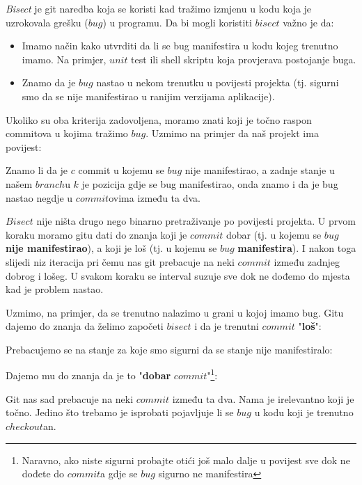 
\emph{Bisect} je git naredba koja se koristi kad tražimo izmjenu u kodu koja je uzrokovala grešku ($bug$) u programu.
Da bi mogli koristiti $bisect$ važno je da:

\begin{itemize}
    \item Imamo način kako utvrditi da li se bug manifestira u kodu kojeg trenutno imamo. Na primjer, $unit$ test ili shell skriptu koja provjerava postojanje buga.
    \item Znamo da je $bug$ nastao u nekom trenutku u povijesti projekta (tj. sigurni smo da se nije manifestirao u ranijim verzijama aplikacije).
\end{itemize}

Ukoliko su oba kriterija zadovoljena, moramo znati koji je točno raspon commitova u kojima tražimo $bug$.
Uzmimo na primjer da naš projekt ima povijest:



Znamo li da je $c$ commit u kojemu se $bug$ nije manifestirao, a zadnje stanje u našem $branch$u $k$ je pozicija gdje se bug manifestirao, onda znamo i da je bug nastao negdje u $commit$ovima između ta dva.

$Bisect$ nije ništa drugo nego binarno pretraživanje po povijesti projekta. 
U prvom koraku moramo gitu dati do znanja koji je $commit$ dobar (tj. u kojemu se $bug$ \textbf{nije manifestirao}), a koji je loš (tj. u kojemu se $bug$ \textbf{manifestira}).
I nakon toga slijedi niz iteracija pri čemu nas git prebacuje na neki $commit$ između zadnjeg dobrog i lošeg.
U svakom koraku se interval suzuje sve dok ne dođemo do mjesta kad je problem nastao.

Uzmimo, na primjer, da se trenutno nalazimo u grani u kojoj imamo bug.
Gitu dajemo do znanja da želimo započeti $bisect$ i da je trenutni $commit$ "\textbf{loš}":



Prebacujemo se na stanje za koje smo sigurni da se stanje nije manifestiralo:



Dajemo mu do znanja da je to "\textbf{dobar} $commit$"\footnote{Naravno, ako niste sigurni probajte otići još malo dalje u povijest sve dok ne dođete do $commit$a gdje se $bug$ sigurno ne manifestira}:



Git nas sad prebacuje na neki $commit$ između ta dva.
Nama je irelevantno koji je točno.
Jedino što trebamo je isprobati pojavljuje li se $bug$ u kodu koji je trenutno $checkout$an.

